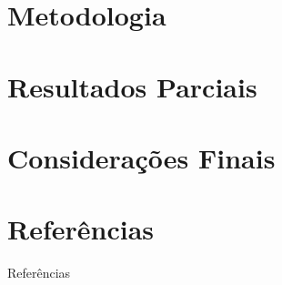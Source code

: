 \documentclass[aspectratio=169]{beamer}
\begin{document}
\section{Metodologia}

\section{Resultados Parciais}

\section{Considerações Finais}


\section{Referências}


\begin{frame}[allowframebreaks]{Referências}

\end{frame}

\end{document}

